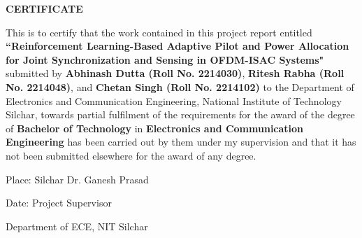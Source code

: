 \begin{center}
{\large{\bf{CERTIFICATE}}}
\end{center}

\noindent
This is to certify that the work contained in this project report entitled \textbf{``Reinforcement Learning-Based Adaptive Pilot and Power Allocation for Joint Synchronization and Sensing in OFDM-ISAC Systems"} submitted by \textbf{Abhinash Dutta (Roll No. 2214030)}, \textbf{Ritesh Rabha (Roll No. 2214048)}, and \textbf{Chetan Singh (Roll No. 2214102)} to the Department of Electronics and Communication Engineering, National Institute of Technology Silchar, towards partial fulfilment of the requirements for the award of the degree of \textbf{Bachelor of Technology} in \textbf{Electronics and Communication Engineering} has been carried out by them under my supervision and that it has not been submitted elsewhere for the award of any degree.

\vspace{4cm}

\noindent Place: Silchar \hfill Dr. Ganesh Prasad

\noindent Date: \hfill Project Supervisor

\noindent \hfill Department of ECE, NIT Silchar

\clearpage
